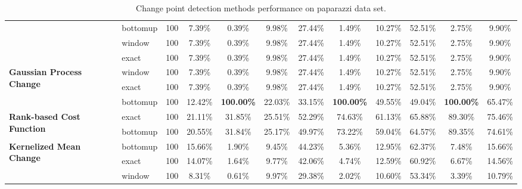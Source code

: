 \begin{sidewaystable}
{\begin{tabular}{llcccccccccc}
    & bottomup & 100  &        7.39\% &     0.39\% &  9.98\% &        27.44\% &      1.49\% & 10.27\% &        52.51\% &      2.75\% &  9.90\% \\
    & window & 100  &        7.39\% &     0.39\% &  9.98\% &        27.44\% &      1.49\% & 10.27\% &        52.51\% &      2.75\% &  9.90\% \\
    & exact & 100  &        7.39\% &     0.39\% &  9.98\% &        27.44\% &      1.49\% & 10.27\% &        52.51\% &      2.75\% &  9.90\% \\ \midrule
\multirow{3}{*}{\textbf{Gaussian Process Change}}
    & window & 100  &        7.39\% &     0.39\% &  9.98\% &        27.44\% &      1.49\% & 10.27\% &        52.51\% &      2.75\% &  9.90\% \\
    & exact & 100  &        7.39\% &     0.39\% &  9.98\% &        27.44\% &      1.49\% & 10.27\% &        52.51\% &      2.75\% &  9.90\% \\
    & bottomup & 100  &       12.42\% &   \textbf{100.00\%} & 22.03\% &        33.15\% &    \textbf{100.00\%} & 49.55\% &        49.04\% &    \textbf{100.00\%} & 65.47\% \\ \midrule
\multirow{2}{*}{\textbf{Rank-based Cost Function}}
    & exact & 100  &       21.11\% &    31.85\% & 25.51\% &        52.29\% &     74.63\% & 61.13\% &        65.88\% &     89.30\% & 75.46\% \\
    & bottomup & 100  &       20.55\% &    31.84\% & 25.17\% &        49.97\% &     73.22\% & 59.04\% &        64.57\% &     89.35\% & 74.61\% \\ \midrule
\multirow{3}{*}{\textbf{Kernelized Mean Change}} 
    & bottomup & 100  &       15.66\% &     1.90\% &  9.45\% &        44.23\% &      5.36\% & 12.95\% &        62.37\% &      7.48\% & 15.66\% \\
    & exact & 100  &       14.07\% &     1.64\% &  9.77\% &        42.06\% &      4.74\% & 12.59\% &        60.92\% &      6.67\% & 14.56\% \\
    & window & 100  &        8.31\% &     0.61\% &  9.97\% &        29.38\% &      2.02\% & 10.60\% &        53.34\% &      3.39\% & 10.79\% \\
\bottomrule
\end{tabular}%
}
    \caption{Change point detection methods performance on paparazzi data set.}
    \label{tab:cpd_paparazzi}
\end{sidewaystable}

